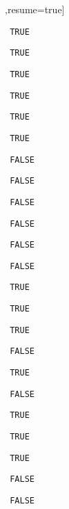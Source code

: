 \begin{solution}
\begin{sltasks}[counter-format=2.tsk[1],resume=true]
\begin{items}
    \item \texttt{ TRUE }
    \item \texttt{ TRUE }
    \item \texttt{ TRUE }
  \end{items}
  \task
  \begin{items}
    \item \texttt{ TRUE }
    \item \texttt{ TRUE }
    \item \texttt{ TRUE }
    \item \texttt{ FALSE }
    \item \texttt{ FALSE }
  \end{items}
  \task
  \begin{items}
    \item \texttt{ FALSE }
    \item \texttt{ FALSE }
    \item \texttt{ FALSE }
    \item \texttt{ FALSE }
    \item \texttt{ TRUE }
  \end{items}
  \task
  \begin{items}
    \item \texttt{ TRUE }
    \item \texttt{ TRUE }
    \item \texttt{ FALSE }
    \item \texttt{ TRUE }
    \item \texttt{ FALSE }
  \end{items}
  \task
  \begin{items}
    \item \texttt{ TRUE }
    \item \texttt{ TRUE }
    \item \texttt{ TRUE }
    \item \texttt{ FALSE }
    \item \texttt{ FALSE }
  \end{items}
\end{sltasks}
\end{solution}
